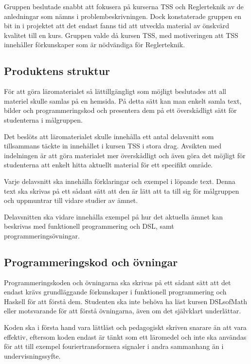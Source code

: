 \documentclass[]{article}
\begin{document}
Gruppen beslutade snabbt att fokusera på kurserna TSS och Reglerteknik av de
anledningar som nämns i problembeskrivningen. Dock konstaterade gruppen en bit
in i projektet att det endast fanns tid att utveckla material av önskvärd
kvalitet till en kurs. Gruppen valde då kursen TSS, med motiveringen att
TSS innehåller förkunskaper som är nödvändiga för Reglerteknik.

\subsection{Produktens struktur}
För att göra läromaterialet så lättillgängligt som möjligt beslutades att
all materiel skulle samlas på en hemsida. På detta sätt kan man enkelt
samla text, bilder och programmeringskod och presentera dem på ett
överskådligt sätt för studenterna i målgruppen.

Det beslöts att läromaterialet skulle innehålla ett antal delavsnitt som
tillsammans täckte in innehållet i kursen TSS i stora drag.
Avsikten med indelningen är att göra materialet mer överskådligt och
även göra det möjligt för studenterna att enkelt hitta aktuellt material
för ett specifikt område.

Varje delavsnitt ska innehålla förklaringar och exempel i löpande text.
Denna text ska skrivas på ett sådant sätt att den är lätt att ta till
sig för målgruppen och uppmuntrar till vidare studier av ämnet.

Delavsnitten ska vidare innehålla exempel på hur det aktuella ämnet kan
beskrivas med funktionell programmering och DSL, samt programmeringsövningar.

\subsection{Programmeringskod och övningar}

Programmeringskoden och övningarna ska skrivas på ett sådant sätt att det endast krävs grundläggande förkunskaper i
funktionell programmering och Haskell för att förstå dem. Studenten ska inte behöva ha läst kursen DSLsofMath eller
motsvarande för att förstå övningarna, även om det självklart underlättar.

Koden ska i första hand vara lättläst och pedagogiskt skriven snarare än att vara effektiv, eftersom koden endast är
tänkt som ett läromedel och inte ska användas för att till exempel fouriertransformera signaler i andra sammanhang än i
undervisningssyfte.
\end{document}
